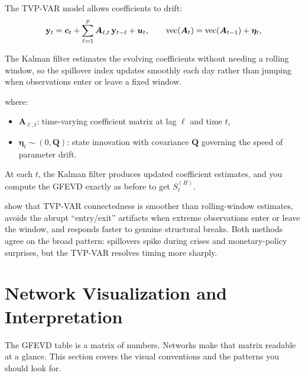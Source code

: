 The TVP-VAR model allows coefficients to drift:
\begin{equation}\label{eq:tvp-var}
  \mathbf{y}_t = \bm{c}_t + \sum_{\ell=1}^{p} \bm{A}_{\ell,t} \, \mathbf{y}_{t-\ell}
          + \bm{u}_t,
  \qquad
  \operatorname{vec}(\bm{A}_t) = \operatorname{vec}(\bm{A}_{t-1}) + \bm{\eta}_t,
\end{equation}

\begin{intuition}
The Kalman filter
estimates the evolving coefficients without needing a rolling window, so the spillover
index updates smoothly each day rather than jumping when observations enter or leave
a fixed window.
\end{intuition}

where:
\begin{itemize}[nosep]
  \item $\bm{A}_{\ell,t}$: time-varying coefficient matrix at lag $\ell$ and time $t$,
  \item $\bm{\eta}_t \sim (0, \bm{Q})$: state innovation with covariance $\bm{Q}$
        governing the speed of parameter drift.
\end{itemize}

At each $t$, the Kalman filter produces updated coefficient estimates, and you
compute the GFEVD exactly as before to get $S^{(H)}_t$.

\begin{keyresult}
\citet{AntonakakisChatziantoniouGabauer2020} show that TVP-VAR connectedness is
smoother than rolling-window estimates, avoids the abrupt ``entry/exit'' artifacts
when extreme observations enter or leave the window, and responds faster to genuine
structural breaks.  Both methods agree on the broad pattern: spillovers spike during
crises and monetary-policy surprises, but the TVP-VAR resolves timing more sharply.
\end{keyresult}


\section{Network Visualization and Interpretation}\label{sec:network-viz}

The GFEVD table is a matrix of numbers.  Networks make that matrix readable at a
glance.  This section covers the visual conventions and the patterns you should look
for.

